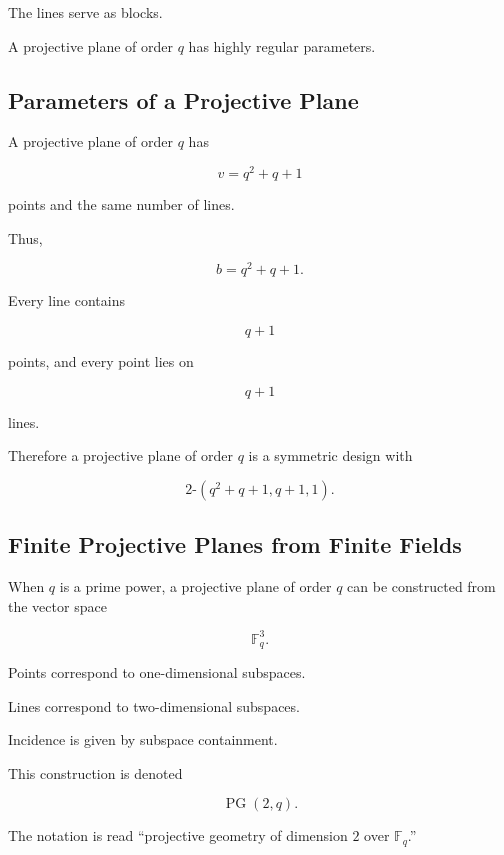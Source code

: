 The lines serve as blocks.

A projective plane of order \(q\) has highly regular parameters.

\subsection{Parameters of a Projective Plane}
\label{subsec:projective-plane-parameters}

A projective plane of order \(q\) has

\[
\boxed{
v=q^2+q+1
}
\]

points and the same number of lines.

Thus,

\[
\boxed{
b=q^2+q+1.
}
\]

Every line contains

\[
\boxed{
q+1
}
\]

points, and every point lies on

\[
q+1
\]

lines.

Therefore a projective plane of order \(q\) is a symmetric design with

\[
\boxed{
2\text{-}(q^2+q+1,q+1,1).
}
\]

\subsection{Finite Projective Planes from Finite Fields}
\label{subsec:projective-planes-finite-fields}

When \(q\) is a prime power, a projective plane of order \(q\) can be
constructed from the vector space

\[
\mathbb{F}_q^3.
\]

Points correspond to one-dimensional subspaces.

Lines correspond to two-dimensional subspaces.

Incidence is given by subspace containment.

This construction is denoted

\[
\boxed{
\operatorname{PG}(2,q).
}
\]

The notation is read ``projective geometry of dimension \(2\) over
\(\mathbb{F}_q\).''

